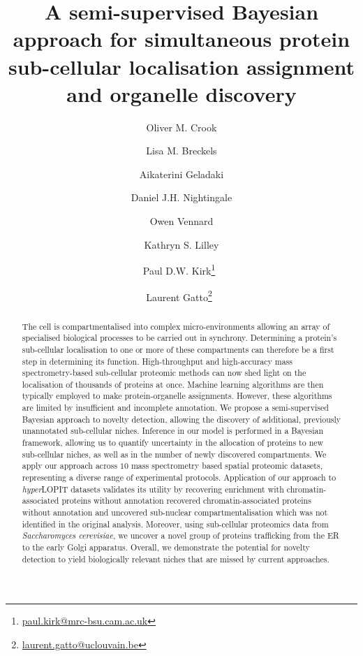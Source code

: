 \documentclass[12pt,english]{article}
\title{A semi-supervised Bayesian approach for simultaneous protein sub-cellular localisation assignment and organelle discovery }
\author[1,2]{Oliver M. Crook}
\author[1]{Lisa M. Breckels}
\author[1]{Aikaterini Geladaki}
\author[1]{Daniel J.H. Nightingale}
\author[1]{Owen Vennard}
\author[1]{Kathryn S. Lilley}
\author[2]{Paul D.W. Kirk\thanks{\url{paul.kirk@mrc-bsu.cam.ac.uk}}~}
\author[3]{Laurent Gatto\thanks{\url{laurent.gatto@uclouvain.be}}~}
\affil[1]{Cambridge Centre for Proteomics, Department of Biochemistry,
	University of Cambridge, Cambridge, UK}
\affil[2]{MRC Biostatistics Unit, Cambridge Institute for Public
	Health, Cambridge, UK}
\affil[3]{de Duve Institute, UCLouvain, Avenue
	Hippocrate 75, 1200 Brussels, Belgium}
\begin{document}
\maketitle

\begin{abstract}
The cell is compartmentalised into complex micro-environments allowing an array of specialised biological processes to be carried out in synchrony. Determining a protein's sub-cellular localisation to one or more of these compartments can therefore be a first step in determining its function. High-throughput and high-accuracy mass spectrometry-based sub-cellular proteomic methods can now shed light on the localisation of thousands of proteins at once. Machine learning algorithms are then typically employed to make protein-organelle assignments. However, these algorithms are limited by insufficient and incomplete annotation. We propose a semi-supervised Bayesian approach to novelty detection, allowing the discovery of additional, previously unannotated sub-cellular niches. Inference in our model is performed in a Bayesian framework, allowing us to quantify uncertainty in the allocation of proteins to new sub-cellular niches, as well as in the number of newly discovered compartments. We apply our approach across $10$ mass spectrometry based spatial proteomic datasets, representing a diverse range of experimental protocols. Application of our approach to \textit{hyper}LOPIT datasets validates its utility by recovering enrichment with chromatin-associated proteins without annotation recovered chromatin-associated proteins without annotation and uncovered sub-nuclear compartmentalisation which was not identified in the original analysis. Moreover, using sub-cellular proteomics data from \textit{Saccharomyces cerevisiae}, we uncover a novel group of proteins trafficking from the ER to the early Golgi apparatus. Overall, we demonstrate the potential for novelty detection to yield biologically relevant niches that are missed by current approaches.
\end{abstract}
\clearpage
\end{document}
